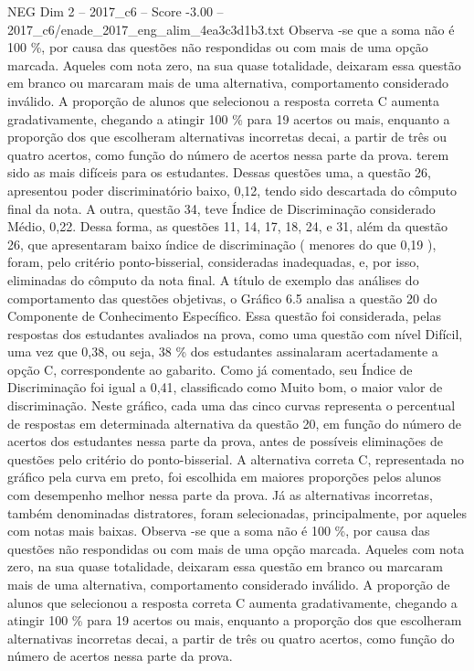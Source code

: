 \begin{textsample}{NEG Dim 2 – 2017\_c6 – Score -3.00 – 2017\_c6/enade\_2017\_eng\_alim\_4ea3c3d1b3.txt}
Observa -se que a soma não é 100 \%, por causa das questões não respondidas ou com mais de uma opção marcada.
Aqueles com nota zero, na sua quase totalidade, deixaram essa questão em branco ou marcaram mais de uma alternativa, comportamento considerado inválido.
A proporção de alunos que selecionou a resposta correta C aumenta gradativamente, chegando a atingir 100 \% para 19 acertos ou mais, enquanto a proporção dos que escolheram alternativas incorretas decai, a partir de três ou quatro acertos, como função do número de acertos nessa parte da prova. terem sido as mais difíceis para os estudantes.
Dessas questões uma, a questão 26, apresentou poder discriminatório baixo, 0,12, tendo sido descartada do cômputo final da nota.
A outra, questão 34, teve Índice de Discriminação considerado Médio, 0,22.
Dessa forma, as questões 11, 14, 17, 18, 24, e 31, além da questão 26, que apresentaram baixo índice de discriminação ( menores do que 0,19 ), foram, pelo critério ponto-bisserial, consideradas inadequadas, e, por isso, eliminadas do cômputo da nota final.
A título de exemplo das análises do comportamento das questões objetivas, o Gráfico 6.5 analisa a questão 20 do Componente de Conhecimento Específico.
Essa questão foi considerada, pelas respostas dos estudantes avaliados na prova, como uma questão com nível Difícil, uma vez que 0,38, ou seja, 38 \% dos estudantes assinalaram acertadamente a opção C, correspondente ao gabarito.
Como já comentado, seu Índice de Discriminação foi igual a 0,41, classificado como Muito bom, o maior valor de discriminação.
Neste gráfico, cada uma das cinco curvas representa o percentual de respostas em determinada alternativa da questão 20, em função do número de acertos dos estudantes nessa parte da prova, antes de possíveis eliminações de questões pelo critério do ponto-bisserial.
A alternativa correta C, representada no gráfico pela curva em preto, foi escolhida em maiores proporções pelos alunos com desempenho melhor nessa parte da prova.
Já as alternativas incorretas, também denominadas distratores, foram selecionadas, principalmente, por aqueles com notas mais baixas.
Observa -se que a soma não é 100 \%, por causa das questões não respondidas ou com mais de uma opção marcada.
Aqueles com nota zero, na sua quase totalidade, deixaram essa questão em branco ou marcaram mais de uma alternativa, comportamento considerado inválido.
A proporção de alunos que selecionou a resposta correta C aumenta gradativamente, chegando a atingir 100 \% para 19 acertos ou mais, enquanto a proporção dos que escolheram alternativas incorretas decai, a partir de três ou quatro acertos, como função do número de acertos nessa parte da prova.

\end{textsample}
